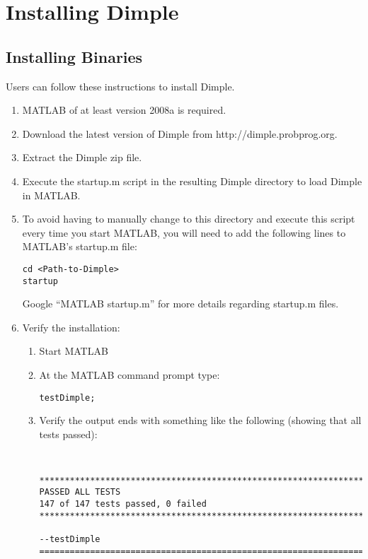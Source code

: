 \section{Installing Dimple}


\subsection{Installing Binaries}

Users can follow these instructions to install Dimple.

\ifmatlab

\begin{enumerate}
\item MATLAB of at least version 2008a is required. 
\item Download the latest version of Dimple from http://dimple.probprog.org.
\item Extract the Dimple zip file.
\item Execute the startup.m script in the resulting Dimple directory to 
load Dimple in MATLAB.
\item To avoid having to manually change to this directory and execute 
this script every time you start MATLAB, you will need to add the following lines to MATLAB's startup.m file:
\begin{lstlisting}
cd <Path-to-Dimple>
startup
\end{lstlisting}
Google ``MATLAB startup.m'' for more details regarding startup.m files.
\item Verify the installation:
\begin{enumerate}
\item Start MATLAB
\item  At the MATLAB command prompt type:
\begin{lstlisting} 
testDimple;
\end{lstlisting}
\item Verify the output ends with something like the following (showing that all tests passed): \\
\begin{minipage}{\textwidth}
\begin{lstlisting} 


**********************************************************************
PASSED ALL TESTS
147 of 147 tests passed, 0 failed
**********************************************************************

--testDimple
======================================================================
\end{lstlisting}
\end{minipage}

\end{enumerate}
\end{enumerate}

